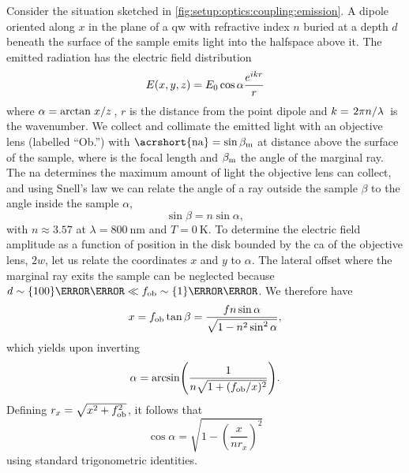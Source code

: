 Consider the situation sketched in \cref{fig:setup:optics:coupling:emission}.
A dipole oriented along $x$ in the plane of a  \gls{qw} with refractive index $n$ buried at a depth $d$ beneath the surface of the sample emits light into the halfspace above it.
The emitted radiation has the electric field distribution
\begin{equation}\label{eq:setup:optics:coupling:efield}
    E(x,y,z) = E_0\cos\alpha\frac{e^{i k r}}{r}
\end{equation}
where $\alpha=\arctan{\flatfrac{x}{z}}$, $r$ is the distance from the point dipole and $k=\flatfrac{2\pi n}{\lambda}$ is the wavenumber.
We collect and collimate the emitted light with an objective lens (labelled \enquote{Ob.}) with $\mr{\acrshort{na}}=\sin\beta_\mr{m}$ at distance \fob above the surface of the sample, where \fob is the focal length and $\beta_{\mathrm{m}}$ the angle of the marginal ray.
The \gls{na} determines the maximum amount of light the objective lens can collect, and using Snell's law we can relate the angle of a ray outside the sample $\beta$ to the angle inside the sample $\alpha$,
\begin{equation}\label{eq:setup:optics:coupling:snell}
    \sin\beta = n\sin\alpha,
\end{equation}
with $n\approx 3.57$ at $\lambda=\qty{800}{\nano\meter}$ and $T=\qty{0}{\kelvin}$.
To determine the electric field amplitude as a function of position in the disk bounded by the \gls{ca} of the objective lens, $2w$, let us relate the coordinates $x$ and $y$ to $\alpha$.
The lateral offset where the marginal ray exits the sample can be neglected because $d \sim \qty{100}{\nano\meter}\ll \fob\sim\qty{1}{\milli\meter}$.
We therefore have
\begin{equation}
    x = f_{\mathrm{ob}}\tan\beta = \frac{fn\sin\alpha}{\sqrt{1-n^2\sin^2\alpha}},
\end{equation}
which yields upon inverting
\begin{equation}
    \alpha = \arcsin(\frac{1}{n\sqrt{1 + (f_{\mathrm{ob}}/x)^2}}).
\end{equation}
Defining $r_{x}=\sqrt{x^2 + f_{\mathrm{ob}}^2}$, it follows that
\begin{equation}
    \cos\alpha = \sqrt{1 - \left(\frac{x}{n r_{x}}\right)^2}
\end{equation}
using standard trigonometric identities.

